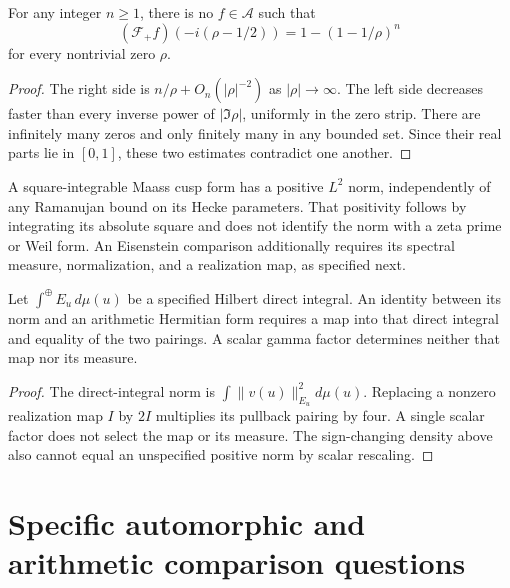 \begin{proposition}
\label{v4-arith:w5-a:prop:li-via-weil}
For any integer $n\ge1$, there is no $f\in\mathscr A$ such that
\[
 (\mathcal F_+f)(-i(\rho-1/2))=1-(1-1/\rho)^n
\]
for every nontrivial zero $\rho$.
\end{proposition}
\begin{proof}
The right side is $n/\rho+O_n(|\rho|^{-2})$ as $|\rho|\to\infty$.
The left side decreases faster than every inverse power of
$|\Im\rho|$, uniformly in the zero strip. There are infinitely many
zeros and only finitely many in any bounded set. Since their real
parts lie in $[0,1]$, these two estimates contradict one another.
\end{proof}

\begin{remark}
\label{v4-arith:w5-a:rem:non-tempered}
A square-integrable Maass cusp form has a positive \(L^2\) norm,
independently of any Ramanujan bound on its Hecke parameters.
That positivity follows by integrating its absolute square and does
not identify the norm with a zeta prime or Weil form.
An Eisenstein comparison additionally requires its spectral measure,
normalization, and a realization map, as specified next.
\end{remark}

\begin{proposition}
\label{v4-arith:w5-a:prop:eisenstein-residual}
Let $\int^\oplus E_u\,d\mu(u)$ be a specified Hilbert direct integral.
An identity between its norm and an arithmetic Hermitian form requires
a map into that direct integral and equality of the two pairings.
A scalar gamma factor determines neither that map nor its measure.
\end{proposition}
\begin{proof}
The direct-integral norm is $\int\|v(u)\|_{E_u}^2d\mu(u)$.
Replacing a nonzero realization map $I$ by $2I$ multiplies its
pullback pairing by four. A single scalar factor does not select
the map or its measure. The sign-changing density above also
cannot equal an unspecified positive norm by scalar rescaling.
\end{proof}

\section{Specific automorphic and arithmetic comparison questions}
\label{v4-arith:pres57:comparison-questions}

